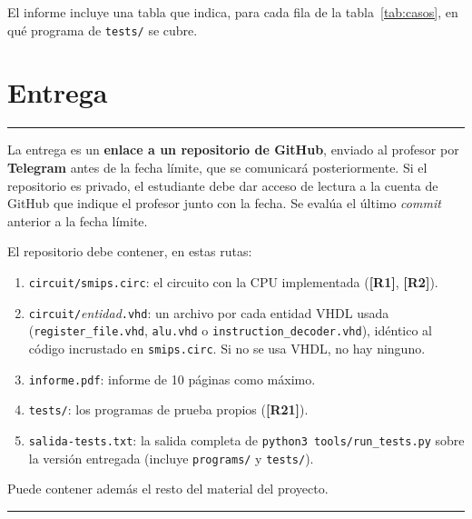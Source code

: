 \documentclass[11pt,a4paper]{article}
\newcommand{\sig}[1]{\texttt{#1}}
\newcommand{\req}[1]{\textbf{[#1]}}
\newenvironment{obligatorio}{\begin{center}\begin{minipage}{0.95\linewidth}\hrule\smallskip}{\smallskip\hrule\end{minipage}\end{center}}
\begin{document}
\noindent El informe incluye una tabla que indica, para cada fila de la tabla~\ref{tab:casos}, en qué programa de \sig{tests/} se cubre.

\section{Entrega}

\begin{obligatorio}
\begin{description}[leftmargin=1.2cm,style=nextline]
\item[\req{R22}] La entrega es un \textbf{enlace a un repositorio de GitHub}, enviado al profesor por \textbf{Telegram} antes de la fecha límite, que se comunicará posteriormente. Si el repositorio es privado, el estudiante debe dar acceso de lectura a la cuenta de GitHub que indique el profesor junto con la fecha. Se evalúa el último \emph{commit} anterior a la fecha límite.
\item[\req{R23}] El repositorio debe contener, en estas rutas:
\begin{enumerate}
\item \sig{circuit/smips.circ}: el circuito con la CPU implementada (\req{R1}, \req{R2}).
\item \sig{circuit/}\emph{entidad}\sig{.vhd}: un archivo por cada entidad VHDL usada (\sig{register\_file.vhd}, \sig{alu.vhd} o \sig{instruction\_decoder.vhd}), idéntico al código incrustado en \sig{smips.circ}. Si no se usa VHDL, no hay ninguno.
\item \sig{informe.pdf}: informe de 10 páginas como máximo.
\item \sig{tests/}: los programas de prueba propios (\req{R21}).
\item \sig{salida-tests.txt}: la salida completa de \verb|python3 tools/run_tests.py| sobre la versión entregada (incluye \sig{programs/} y \sig{tests/}).
\end{enumerate}
Puede contener además el resto del material del proyecto.
\end{description}
\end{obligatorio}
\end{document}

